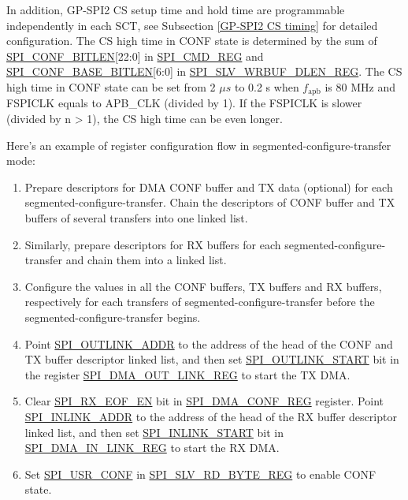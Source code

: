\documentclass[main\_\_EN.tex]{subfiles}
\begin{document}
In addition, GP-SPI2 CS setup time and hold time are programmable independently in each SCT, see Subsection \ref{GP-SPI2 CS timing} for detailed configuration. The CS high time in CONF state is determined by the sum of \hyperref[fielddesc:SPICONFBITLEN]{SPI\_CONF\_BITLEN}[22:0] in \hyperref[regdesc:SPICMDREG]{SPI\_CMD\_REG} and \hyperref[fielddesc:SPICONFBASEBITLEN]{SPI\_CONF\_BASE\_BITLEN}[6:0] in \hyperref[regdesc:SPISLVWRBUFDLENREG]{SPI\_SLV\_WRBUF\_DLEN\_REG}. The CS high time in CONF state can be set from 2 $\mu s$ to 0.2 s when $f_{\textrm{apb}}$ is 80 MHz and FSPICLK equals to APB\_CLK (divided by 1). If the FSPICLK is slower (divided by n > 1), the CS high time can be even longer.


Here's an example of register configuration flow in segmented-configure-transfer mode:
 \begin{enumerate}
   \item Prepare descriptors for DMA CONF buffer and TX data (optional) for each segmented-configure-transfer. Chain the descriptors of CONF buffer and TX buffers of several transfers into one linked list.

   \item Similarly, prepare descriptors for RX buffers for each segmented-configure-transfer and chain them into a linked list.
   \item Configure the values in all the CONF buffers, TX buffers and RX buffers, respectively for each transfers of segmented-configure-transfer before the segmented-configure-transfer begins.

   \item Point \hyperref[fielddesc:SPIOUTLINKADDR]{SPI\_OUTLINK\_ADDR} to the address of the head of the CONF and TX buffer descriptor linked list, and then set \hyperref[fielddesc:SPIOUTLINKSTART]{SPI\_OUTLINK\_START} bit in the register \hyperref[regdesc:SPIDMAOUTLINKREG]{SPI\_DMA\_OUT\_LINK\_REG} to start the TX DMA.


   \item Clear \hyperref[fielddesc:SPIRXEOFEN]{SPI\_RX\_EOF\_EN} bit in \hyperref[regdesc:SPIDMACONFREG]{SPI\_DMA\_CONF\_REG} register. Point \hyperref[fielddesc:SPIINLINKSTART]{SPI\_INLINK\_ADDR} to the address of the head of the RX buffer descriptor linked list, and then set \hyperref[fielddesc:SPIINLINKSTART]{SPI\_INLINK\_START} bit in \hyperref[regdesc:SPIDMAINLINKREG]{SPI\_DMA\_IN\_LINK\_REG} to start the RX DMA.

   \item Set \hyperref[fielddesc:SPIUSRCONF]{SPI\_USR\_CONF} in \hyperref[regdesc:SPISLVRDBYTEREG]{SPI\_SLV\_RD\_BYTE\_REG} to enable CONF state.


\end{enumerate}
\end{document}
